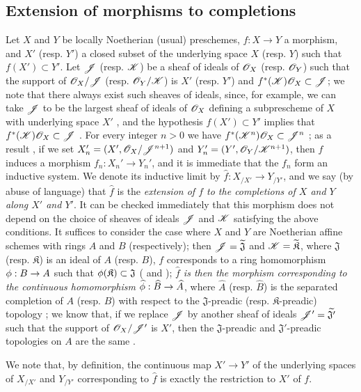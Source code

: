 \subsection{Extension of morphisms to completions}
\label{subsection:1.10.9}

\begin{env}[10.9.1]
\label{1.10.9.1}
Let $X$ and $Y$ be locally Noetherian (usual) preschemes, $f:X\to Y$ a morphism, and $X'$ (resp. $Y'$) a closed subset of the underlying space $X$ (resp. $Y$) such that $f(X')\subset Y'$.
Let $\mathscr{J}$ (resp. $\mathscr{K}$) be a sheaf of ideals of $\mathscr{O}_X$ (resp. $\mathscr{O}_Y$) such that the support of $\mathscr{O}_X/\mathscr{J}$ (resp. $\mathscr{O}_Y/\mathscr{K}$) is $X'$ (resp. $Y'$) and $f^*(\mathscr{K})\mathscr{O}_X\subset\mathscr{J}$; we note that there always exist such sheaves of ideals, since, for example, we can take $\mathscr{J}$ to be the largest sheaf of ideals of $\mathscr{O}_X$ defining a subprescheme of $X$ with underlying space $X'$ , and the hypothesis $f(X')\subset Y'$ implies that $f^*(\mathscr{K})\mathscr{O}_X\subset\mathscr{J}$ .
For every integer $n>0$ we have $f^*(\mathscr{K}^n)\mathscr{O}_X\subset\mathscr{J}^n$ ; as a result , if we set $X_n'=(X',\mathscr{O}_X/\mathscr{J}^{n+1})$ and $Y_n'=(Y',\mathscr{O}_Y/\mathscr{K}^{n+1})$, then $f$ induces a morphism $f_n:X_n'\to Y_n'$, and it is immediate that the $f_n$ form an inductive system.
We denote its inductive limit  by $\widehat{f}:X_{/X'}\to Y_{/Y'}$, and we say (by abuse of language) that $\widehat{f}$ is the \emph{extension of $f$ to the completions of $X$ and $Y$ along $X'$ and $Y'$}.
It can be checked immediately that this morphism does not depend on the choice of sheaves of ideals $\mathscr{J}$ and $\mathscr{K}$ satisfying the above conditions.
It suffices to consider the case where $X$ and $Y$ are Noetherian affine schemes with rings $A$ and $B$ (respectively); then $\mathscr{J}=\widetilde{\mathfrak{J}}$ and $\mathscr{K}=\widetilde{\mathfrak{K}}$, where $\mathfrak{J}$ (resp. $\mathfrak{K}$) is an ideal of $A$ (resp. $B$), $f$ corresponds to a ring homomorphism $\vphi:B\to A$ such that $\phi(\mathfrak{K})\subset\mathfrak{J}$ ( and ); \emph{$\widehat{f}$ is then the morphism corresponding  to the continuous homomorphism $\widehat{\vphi}:\widehat{B}\to\widehat{A}$}, where $\widehat{A}$ (resp. $\widehat{B}$) is the separated completion of $A$ (resp. $B$) with respect to the $\mathfrak{J}$-preadic (resp. $\mathfrak{K}$-preadic) topology ; we know that, if we replace $\mathscr{J}$ by another
sheaf of ideals $\mathscr{J}'=\widetilde{\mathfrak{J}'}$ such that the support of $\mathscr{O}_X/\mathscr{J}'$ is $X'$, then the $\mathfrak{J}$-preadic and $\mathfrak{J}'$-preadic topologies on $A$ are the same .

We note that, by definition, the continuous map $X'\to Y'$ of the underlying spaces of $X_{/X'}$ and $Y_{/Y'}$ corresponding to $\widehat{f}$ is exactly the restriction to $X'$ of $f$.
\end{env}


